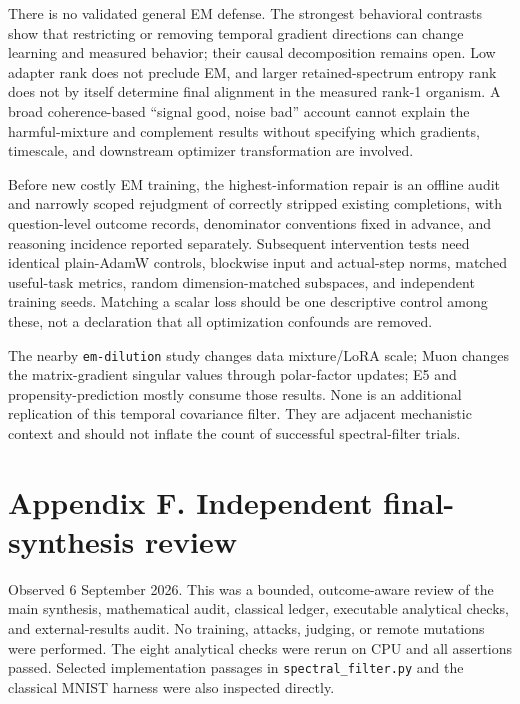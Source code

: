 \documentclass[
  british,
  10pt,
  a4paper,
]{article}
\begin{document}
There is no validated general EM defense. The strongest behavioral
contrasts show that restricting or removing temporal gradient directions
can change learning and measured behavior; their causal decomposition
remains open. Low adapter rank does not preclude EM, and larger
retained-\allowbreak{}spectrum entropy rank does not by itself determine
final alignment in the measured rank-1 organism. A broad
coherence-\allowbreak{}based ``signal good, noise bad'' account cannot
explain the harmful-\allowbreak{}mixture and complement results without
specifying which gradients, timescale, and downstream optimizer
transformation are involved.

Before new costly EM training, the highest-\allowbreak{}information
repair is an offline audit and narrowly scoped rejudgment of correctly
stripped existing completions,\allowbreak{} with
question-\allowbreak{}level outcome records, denominator conventions
fixed in advance, and reasoning incidence reported
separately.\allowbreak{} Subsequent intervention tests need identical
plain-\allowbreak{}AdamW controls, blockwise input and
actual-\allowbreak{}step norms, matched useful-\allowbreak{}task
metrics, random dimension-\allowbreak{}matched subspaces, and
independent training seeds. Matching a scalar loss should be one
descriptive control among these, not a declaration that all optimization
confounds are removed.

The nearby \texttt{em-\allowbreak{}dilution} study changes data
mixture/\allowbreak{}LoRA scale; Muon changes the
matrix-\allowbreak{}gradient singular values through
polar-\allowbreak{}factor updates; E5 and
propensity-\allowbreak{}prediction mostly consume those results. None is
an additional replication of this temporal covariance filter. They are
adjacent mechanistic context and should not inflate the count of
successful spectral-\allowbreak{}filter trials.

\clearpage

\section{\texorpdfstring{Appendix F. Independent
final-\allowbreak{}synthesis
review}{Appendix F. Independent  review}}\label{final-synthesis-audit}

Observed 6 September 2026. This was a bounded,
outcome-\allowbreak{}aware review of the main synthesis, mathematical
audit, classical ledger, executable analytical checks, and
external-\allowbreak{}results audit. No training, attacks, judging, or
remote mutations were performed. The eight analytical checks were rerun
on CPU and all assertions passed. Selected implementation passages in
\texttt{spectral\_\allowbreak{}filter.\allowbreak{}py} and the classical
MNIST harness were also inspected directly.
\end{document}

